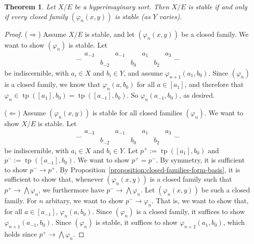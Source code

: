 \documentclass{article}
\newtheorem{theorem}{Theorem}[section]
\theoremstyle{definition}
\DeclareMathOperator{\tp}{tp}
\begin{document}
\begin{theorem}
  Let $X/E$ be a hyperimaginary sort. Then $X/E$ is stable if and only if every closed family $(\varphi_n(x,y))$ is stable (as $Y$ varies).
\end{theorem}
\begin{proof}
  ($\Rightarrow$) Assume $X/E$ is stable, and let $(\varphi_n(x,y))$ be a closed family. We want to show $(\varphi_n)$ is stable. Let
  \begin{equation*}
    \cdots
    \begin{matrix}
      a_{-3} & & a_{-1} & & a_1 & & a_3 \\
      & b_{-2} & & b_0 & & b_2 &
    \end{matrix}
    \cdots
  \end{equation*}
  be indiscernible, with $a_i \in X$ and $b_i \in Y$, and assume $\varphi_{n+1}(a_1,b_0)$. Since $(\varphi_n)$ is a closed family, we know that $\varphi_n(a,b_0)$ for all $a \in [a_1]$, and therefore that $\varphi_n \in \tp([a_1],b_0) = \tp([a_{-1}],b_0)$. So $\varphi_n(a_{-1},b_0)$, as desired.

  ($\Leftarrow$) Assume $(\varphi_n(x,y))$ is stable for all closed families $(\varphi_n)$. We want to show $X/E$ is stable. Let
  \begin{equation*}
    \cdots
    \begin{matrix}
      a_{-3} & & a_{-1} & & a_1 & & a_3 \\
      & b_{-2} & & b_0 & & b_2 &
    \end{matrix}
    \cdots
  \end{equation*}
  be indiscernible, with $a_i \in X$ and $b_i \in Y$. Let $p^+ := \tp([a_1],b_0)$ and $p^- := \tp([a_{-1}],b_0)$. We want to show $p^+ = p^-$. By symmetry, it is sufficient to show $p^- \rightarrow p^+$. By Proposition~\ref{proposition:closed-families-form-basis}, it is sufficient to show that, whenever $(\varphi_n(x,y))$ is a closed family such that $p^+ \rightarrow \bigwedge \varphi_n$, we furthermore have $p^- \rightarrow \bigwedge \varphi_n$. Let $(\varphi_n(x,y))$ be such a closed family. For $n$ arbitary, we want to show $p^- \rightarrow \varphi_n$. That is, we want to show that, for all $a \in [a_{-1}]$, $\varphi_n(a,b_0)$. Since $(\varphi_n)$ is a closed family, it suffices to show $\varphi_{n+1}(a_{-1},b_0)$. Since $(\varphi_n)$ is stable, it suffices to show $\varphi_{n+2}(a_1,b_0)$, which holds since $p^+ \rightarrow \bigwedge \varphi_n$.
\end{proof}
\end{document}
